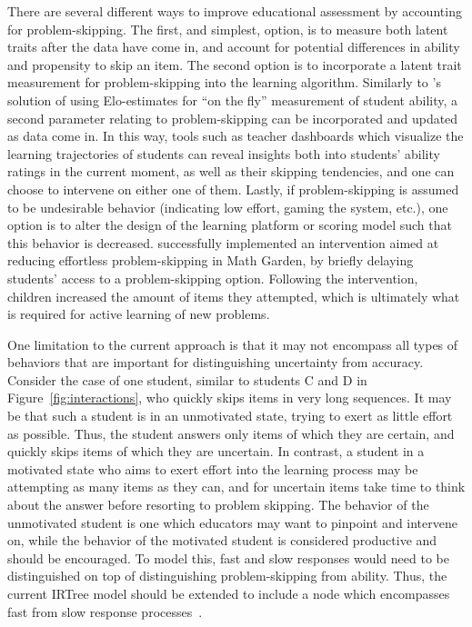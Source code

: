\documentclass{edm_article}
\begin{document}
There are several different ways to improve educational assessment by accounting for problem-skipping. The first, and simplest, option, is to measure both latent traits after the data have come in, and account for potential differences in ability and propensity to skip an item. The second option is to incorporate a latent trait measurement for problem-skipping into the learning algorithm. Similarly to \citet{klinkenberg2011computer}'s solution of using Elo-estimates for ``on the fly'' measurement of student ability, a second parameter relating to problem-skipping can be incorporated and updated as data come in. In this way, tools such as teacher dashboards which visualize the learning trajectories of students can reveal insights both into students' ability ratings in the current moment, as well as their skipping tendencies, and one can choose to intervene on either one of them. Lastly, if problem-skipping is assumed to be undesirable behavior (indicating low effort, gaming the system, etc.), one option is to alter the design of the learning platform or scoring model such that this behavior is decreased. \citet{savi2018delaying} successfully implemented an intervention aimed at reducing effortless problem-skipping in Math Garden, by briefly delaying students' access to a problem-skipping option. Following the intervention, children increased the amount of items they attempted, which is ultimately what is required for active learning of new problems. 

One limitation to the current approach is that it may not encompass all types of behaviors that are important for distinguishing uncertainty from accuracy. Consider the case of one student, similar to students C and D in Figure~\ref{fig:interactions}, who quickly skips items in very long sequences. It may be that such a student is in an unmotivated state, trying to exert as little effort as possible. Thus, the student answers only items of which they are certain, and quickly skips items of which they are uncertain. In contrast, a student in a motivated state who aims to exert effort into the learning process may be attempting as many items as they can, and for uncertain items take time to think about the answer before resorting to problem skipping. The behavior of the unmotivated student is one which educators may want to pinpoint and intervene on, while the behavior of the motivated student is considered productive and should be encouraged. To model this, fast and slow responses would need to be distinguished on top of distinguishing problem-skipping from ability. Thus, the current IRTree model should be extended to include a node which encompasses fast from slow response processes~\cite{coomans2016distinguishing}. 
\end{document}
